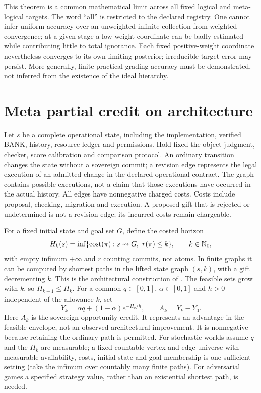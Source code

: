 \documentclass[11pt]{article}
\begin{document}
This theorem is a common mathematical limit across all fixed logical and meta-logical targets. The word ``all'' is restricted to the declared registry. One cannot infer uniform accuracy over an unweighted infinite collection from weighted convergence; at a given stage a low-weight coordinate can be badly estimated while contributing little to total ignorance. Each fixed positive-weight coordinate nevertheless converges to its own limiting posterior; irreducible target error may persist. More generally, finite practical grading accuracy must be demonstrated, not inferred from the existence of the ideal hierarchy.
\section{Meta partial credit on architecture}
Let $s$ be a complete operational state, including the implementation, verified BANK, history, resource ledger and permissions. Hold fixed the object judgment, checker, score calibration and comparison protocol. An ordinary transition changes the state without a sovereign commit; a revision edge represents the legal execution of an admitted change in the declared operational contract. The graph contains possible executions, not a claim that those executions have occurred in the actual history. All edges have nonnegative charged costs. Costs include proposal, checking, migration and execution. A proposed gift that is rejected or undetermined is not a revision edge; its incurred costs remain chargeable.

For a fixed initial state and goal set $G$, define the costed horizon
\begin{equation}H_k(s)=\inf\{\mathrm{cost}(\pi):s\leadsto G,\ r(\pi)\leq k\},\qquad k\in\N_0,\end{equation}
with empty infimum $+\infty$ and $r$ counting commits, not atoms. In finite graphs it can be computed by shortest paths in the lifted state graph $(s,k)$, with a gift decrementing $k$. This is the architectural construction of \cite{creative}. The feasible sets grow with $k$, so $H_{k+1}\leq H_k$. For a common $q\in[0,1]$, $\alpha\in[0,1]$ and $h>0$ independent of the allowance $k$, set
\[Y_k=\alpha q+(1-\alpha)e^{-H_k/h},\qquad A_k=Y_k-Y_0.\]
Here $A_k$ is the sovereign opportunity credit. It represents an advantage in the feasible envelope, not an observed architectural improvement. It is nonnegative because retaining the ordinary path is permitted. For stochastic worlds assume $q$ and the $H_k$ are measurable; a fixed countable vertex and edge universe with measurable availability, costs, initial state and goal membership is one sufficient setting (take the infimum over countably many finite paths). For adversarial games a specified strategy value, rather than an existential shortest path, is needed.
\end{document}
